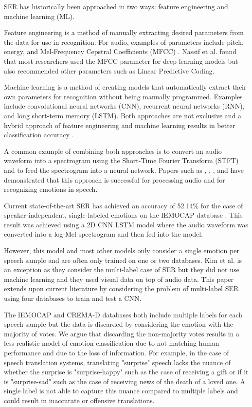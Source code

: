 \documentclass[a4paper, 10pt, conference]{ieeeconf}      %
\begin{document}
SER has historically been approached in two ways: feature engineering and machine learning (ML).

Feature engineering is a method of manually extracting desired parameters from the data for use in  recognition. For audio, examples of parameters include pitch, energy, and Mel-Frequency Cepstral Coefficients (MFCC) \cite{Rybka2013}. Nassif et al. \cite{Nassif2019} found that most researchers used the MFCC parameter for deep learning models but also recommended other parameters such as Linear Predictive Coding. 

Machine learning is a method of creating models that automatically extract their own parameters for recognition without being manually programmed. Examples include convolutional neural networks (CNN), recurrent neural networks (RNN), and long short-term memory (LSTM). Both approaches are not exclusive and a hybrid approach of feature engineering and machine learning results in better classification accuracy \cite{Nassif2019}.

A common example of combining both approaches is to convert an audio waveform into a spectrogram using the Short-Time Fourier Transform (STFT) and to feed the spectrogram into a neural network. Papers such as \cite{Engel2019}, \cite{Chen2018}, \cite{Badshah2019}, and \cite{Zhao2019} have demonstrated that this approach is successful for processing audio and for recognizing emotions in speech.

Current state-of-the-art SER has achieved an accuracy of 52.14\% for the case of speaker-independent, single-labeled emotions on the IEMOCAP database \cite{Zhao2019}. This result was achieved using a 2D CNN LSTM model where the audio waveform was converted into a log-Mel spectrogram and then fed into the model.

However, this model and most other models only consider a single emotion per speech sample and are often only trained on one or two databases. Kim et al. \cite{Kim2018a} is an exception as they consider the multi-label case of SER but they did not use machine learning and they used visual data on top of audio data. This paper extends upon current literature by considering the problem of multi-label SER using four databases to train and test a CNN.

The IEMOCAP \cite{busso_2008} and CREMA-D \cite{cao_2014} databases both include multiple labels for each speech sample but the data is discarded by considering the emotion with the majority of votes. We argue that discarding the non-majority votes results in a less realistic model of emotion classification due to not matching human performance and due to the loss of information. For example, in the case of speech translation systems, translating "surprise" speech lacks the nuance of whether the surprise is "surprise-happy" such as the case of receiving a gift or if it is "surprise-sad" such as the case of receiving news of the death of a loved one. A single label is not able to capture this nuance compared to multiple labels and could result in inaccurate or offensive translations.
\end{document}

